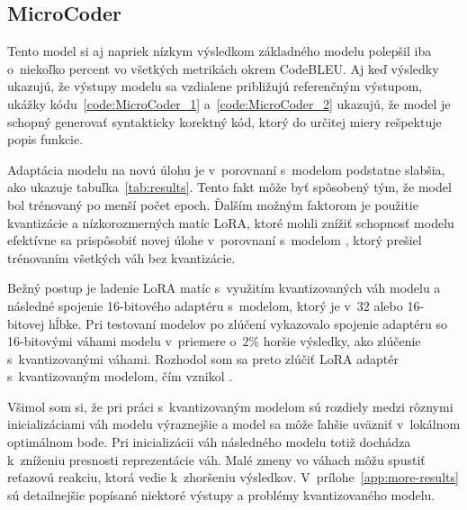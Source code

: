 \subsection{MicroCoder}

Tento model si aj napriek nízkym výsledkom základného modelu polepšil iba o~niekoľko percent vo všetkých metrikách okrem CodeBLEU. Aj keď výsledky ukazujú, že výstupy modelu sa vzdialene približujú referenčným výstupom, ukážky kódu~\ref{code:MicroCoder_1} a~\ref{code:MicroCoder_2} ukazujú, že model je schopný generovať syntakticky korektný kód, ktorý do určitej miery rešpektuje popis funkcie.

Adaptácia modelu na novú úlohu je v~porovnaní s~modelom \MCfim{} podstatne slabšia, ako ukazuje tabuľka~\ref{tab:results}. Tento fakt môže byť spôsobený tým, že model bol trénovaný po menší počet epoch. Ďalším možným faktorom je použitie kvantizácie a nízkorozmerných matíc LoRA, ktoré mohli znížiť schopnosť modelu efektívne sa prispôsobiť novej úlohe v~porovnaní s~modelom \MCfim{}, ktorý prešiel trénovaním všetkých váh bez kvantizácie.

Bežný postup je ladenie LoRA matíc s~využitím kvantizovaných váh modelu a následné spojenie 16-bitového adaptéru s~modelom, ktorý je v~32 alebo 16-bitovej hĺbke. Pri testovaní modelov po zlúčení vykazovalo spojenie adaptéru so 16-bitovými váhami modelu v~priemere o~2\% horšie výsledky, ako zlúčenie s~kvantizovanými váhami. Rozhodol som sa preto zlúčiť LoRA adaptér s~kvantizovaným modelom, čím vznikol \MC{}.

Všimol som si, že pri práci s~kvantizovaným modelom sú rozdiely medzi rôznymi inicializáciami váh modelu výraznejšie a model sa môže ľahšie uväzniť v~lokálnom optimálnom bode. Pri inicializácii váh následného modelu totiž dochádza k~zníženiu presnosti reprezentácie váh. Malé zmeny vo váhach môžu spustiť reťazovú reakciu, ktorá vedie k~zhoršeniu výsledkov. V~prílohe~\ref{app:more-results} sú detailnejšie popísané niektoré výstupy a problémy kvantizovaného modelu.

